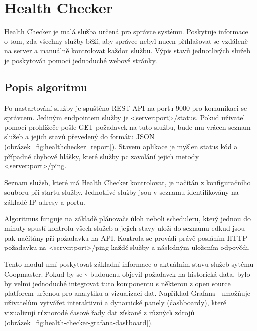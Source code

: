 \section{Health Checker}\label{sec:health-checker}
Health Checker je malá služba určená pro správce systému.
Poskytuje informace o tom, zda všechny služby běží, aby správce nebyl nucen přihlašovat se vzdáleně na server a manuálně kontrolovat každou službu.
Výpis stavů jednotlivých služeb je poskytován pomocí jednoduché webové stránky.

\subsection*{Popis algoritmu}
Po nastartování služby je spuštěno REST API na portu 9000 pro komunikaci se správcem.
Jediným endpointem služby je <server:port>/status.
Pokud uživatel pomocí prohlížeče pošle GET požadavek na tuto službu, bude mu vrácen seznam služeb a jejich stavů převedený do formátu JSON (obrázek~\ref{fig:healthchecker_report}).
Stavem aplikace je myšlen status kód a případné chybové hlášky, které služby po zavolání jejich metody <server:port>/ping.

Seznam služeb, které má Health Checker kontrolovat, je načítán z konfiguračního souboru při startu služby.
Jednotlivé služby jsou v seznamu identifikovány na základě IP adresy a portu.

Algoritmus funguje na základě plánovače úloh neboli scheduleru, který jednou do minuty spustí kontrolu všech služeb a jejich stavy uloží do seznamu odkud jsou pak načítány při požadavku na API.
Kontrola se provádí právě posláním HTTP požadavku na <server:port>/ping každé služby a následným uložením odpovědi.

Tento modul umí poskytovat základní informace o aktuálním stavu služeb sytému Coopmaster.
Pokud by se v budoucnu objevil požadavek na historická data, bylo by velmi jednoduché integrovat tuto komponentu s některou z open source platforem určenou pro analytiku a vizualizaci dat.
Například Grafana~\cite{grafana} umožňuje uživatelům vytvářet interaktivní a dynamické panely (dashboardy), které vizualizují různorodé časové řady dat získané z různých zdrojů (obrázek~\ref{fig:health-checker-grafana-dashboard}).


